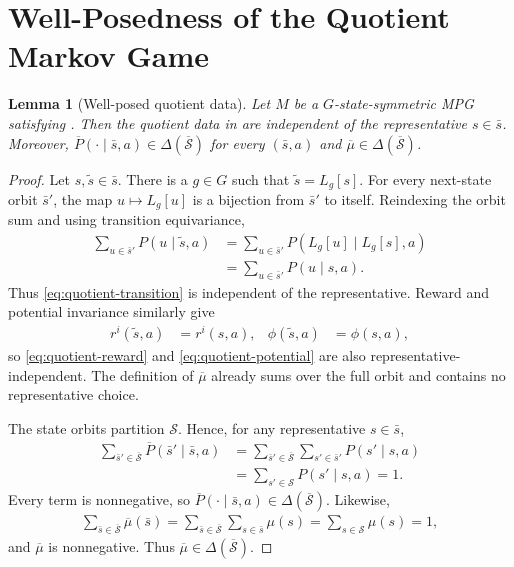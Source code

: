 \documentclass{article}
\theoremstyle{plain}
\newtheorem{lemma}[theorem]{Lemma}
\theoremstyle{definition}
\theoremstyle{remark}
\newcommand{\St}{\mathcal{S}}
\newcommand{\quotient}[1]{\overline{#1}}
\begin{document}
\clearpage
\appendix

\section{Well-Posedness of the Quotient Markov Game}
\label{app:proof-quotient-well-posed}

\begin{lemma}[Well-posed quotient data]
\label{lemma:quotient-well-posed}
Let $M$ be a $G$-state-symmetric MPG satisfying .
Then the quotient data in  are independent of the
representative $s\in\bar s$. Moreover,
$\quotient P(\cdot\mid\bar s,a)\in\Delta(\quotient\St)$ for every
$(\bar s,a)$ and $\quotient\mu\in\Delta(\quotient\St)$.
\end{lemma}

\begin{proof}
Let $s,\widetilde s\in\bar s$. There is a $g\in G$ such that
$\widetilde s=L_g[s]$. For every next-state orbit $\bar s'$, the map
$u\mapsto L_g[u]$ is a bijection from $\bar s'$ to itself. Reindexing the orbit
sum and using transition equivariance,
\begin{align*}
  \sum_{u\in\bar s'}P(u\mid\widetilde s,a)
  &=
  \sum_{u\in\bar s'}P(L_g[u]\mid L_g[s],a)\\
  &=
  \sum_{u\in\bar s'}P(u\mid s,a).
\end{align*}
Thus \eqref{eq:quotient-transition} is independent of the representative.
Reward and potential invariance similarly give
\begin{align*}
  r^i(\widetilde s,a)
  &=
  r^i(s,a),&
  \phi(\widetilde s,a)
  &=
  \phi(s,a),
\end{align*}
so \eqref{eq:quotient-reward} and \eqref{eq:quotient-potential} are also
representative-independent. The definition of $\quotient\mu$ already sums over
the full orbit and contains no representative choice.

The state orbits partition $\St$. Hence, for any representative $s\in\bar s$,
\begin{align*}
  \sum_{\bar s'\in\quotient\St}
  \quotient P(\bar s'\mid\bar s,a)
  &=
  \sum_{\bar s'\in\quotient\St}
  \sum_{s'\in\bar s'}P(s'\mid s,a)\\
  &=
  \sum_{s'\in\St}P(s'\mid s,a)
  =
  1.
\end{align*}
Every term is nonnegative, so
$\quotient P(\cdot\mid\bar s,a)\in\Delta(\quotient\St)$. Likewise,
\begin{align*}
  \sum_{\bar s\in\quotient\St}\quotient\mu(\bar s)
  =
  \sum_{\bar s\in\quotient\St}\sum_{s\in\bar s}\mu(s)
  =
  \sum_{s\in\St}\mu(s)
  =
  1,
\end{align*}
and $\quotient\mu$ is nonnegative. Thus $\quotient\mu\in\Delta(\quotient\St)$.
\end{proof}
\end{document}
